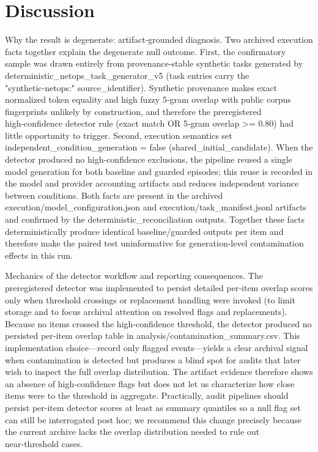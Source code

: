 \documentclass[conference]{IEEEtran}
\begin{document}
\section{Discussion}
Why the result is degenerate: artifact‑grounded diagnosis. Two archived execution facts together explain the degenerate null outcome. First, the confirmatory sample was drawn entirely from provenance‑stable synthetic tasks generated by deterministic\_netops\_task\_generator\_v5 (task entries carry the "synthetic‑netops:" source\_identifier). Synthetic provenance makes exact normalized token equality and high fuzzy 5‑gram overlap with public corpus fingerprints unlikely by construction, and therefore the preregistered high‑confidence detector rule (exact match OR 5‑gram overlap >= 0.80) had little opportunity to trigger. Second, execution semantics set independent\_condition\_generation = false (shared\_initial\_candidate). When the detector produced no high‑confidence exclusions, the pipeline reused a single model generation for both baseline and guarded episodes; this reuse is recorded in the model and provider accounting artifacts and reduces independent variance between conditions. Both facts are present in the archived execution/model\_configuration.json and execution/task\_manifest.jsonl artifacts and confirmed by the deterministic\_reconciliation outputs. Together these facts deterministically produce identical baseline/guarded outputs per item and therefore make the paired test uninformative for generation‑level contamination effects in this run.

Mechanics of the detector workflow and reporting consequences. The preregistered detector was implemented to persist detailed per‑item overlap scores only when threshold crossings or replacement handling were invoked (to limit storage and to focus archival attention on resolved flags and replacements). Because no items crossed the high‑confidence threshold, the detector produced no persisted per‑item overlap table in analysis/contamination\_summary.csv. This implementation choice---record only flagged events---yields a clear archival signal when contamination is detected but produces a blind spot for audits that later wish to inspect the full overlap distribution. The artifact evidence therefore shows an absence of high‑confidence flags but does not let us characterize how close items were to the threshold in aggregate. Practically, audit pipelines should persist per‑item detector scores at least as summary quantiles so a null flag set can still be interrogated post hoc; we recommend this change precisely because the current archive lacks the overlap distribution needed to rule out near‑threshold cases.
\end{document}
